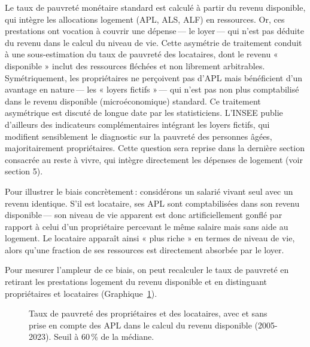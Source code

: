 \documentclass[
  french,
  9pt,
  a4paper,
]{article}
\begin{document}
\begin{tcolorbox}[enhanced jigsaw, leftrule=.75mm, breakable, toptitle=1mm, toprule=.15mm, title={Encadré 1\,--- Pauvreté monétaire et logement\,: le biais des
prestations logement}, opacityback=0, arc=.35mm, opacitybacktitle=0.6, colback=white, coltitle=black, colframe=quarto-callout-note-color-frame, left=2mm, colbacktitle=quarto-callout-note-color!10!white, bottomtitle=1mm, titlerule=0mm, rightrule=.15mm, bottomrule=.15mm]

Le taux de pauvreté monétaire standard est calculé à partir du revenu
disponible, qui intègre les allocations logement (APL, ALS, ALF) en
ressources. Or, ces prestations ont vocation à couvrir une dépense\,---
le loyer\,--- qui n'est pas déduite du revenu dans le calcul du niveau
de vie. Cette asymétrie de traitement conduit à une sous-estimation du
taux de pauvreté des locataires, dont le revenu « disponible » inclut
des ressources fléchées et non librement arbitrables. Symétriquement,
les propriétaires ne perçoivent pas d'APL mais bénéficient d'un avantage
en nature\,--- les « loyers fictifs »\,--- qui n'est pas non plus
comptabilisé dans le revenu disponible (microéconomique) standard. Ce
traitement asymétrique est discuté de longue date par les statisticiens.
L'INSEE publie d'ailleurs des indicateurs complémentaires intégrant les
loyers fictifs, qui modifient sensiblement le diagnostic sur la pauvreté
des personnes âgées, majoritairement propriétaires. Cette question sera
reprise dans la dernière section consacrée au reste à vivre, qui intègre
directement les dépenses de logement (voir section 5).

Pour illustrer le biais concrètement\,: considérons un salarié vivant
seul avec un revenu identique. S'il est locataire, ses APL sont
comptabilisées dans son revenu disponible\,--- son niveau de vie
apparent est donc artificiellement gonflé par rapport à celui d'un
propriétaire percevant le même salaire mais sans aide au logement. Le
locataire apparaît ainsi « plus riche » en termes de niveau de vie,
alors qu'une fraction de ses ressources est directement absorbée par le
loyer.

Pour mesurer l'ampleur de ce biais, on peut recalculer le taux de
pauvreté en retirant les prestations logement du revenu disponible et en
distinguant propriétaires et locataires
(Graphique~\ref{fig-taux-occ-apl}).

\begin{figure}[H]

\caption{\label{fig-taux-occ-apl}Taux de pauvreté des propriétaires et
des locataires, avec et sans prise en compte des APL dans le calcul du
revenu disponible (2005-2023). Seuil à 60\,\% de la médiane.}


\end{figure}
\end{tcolorbox}
\end{document}
